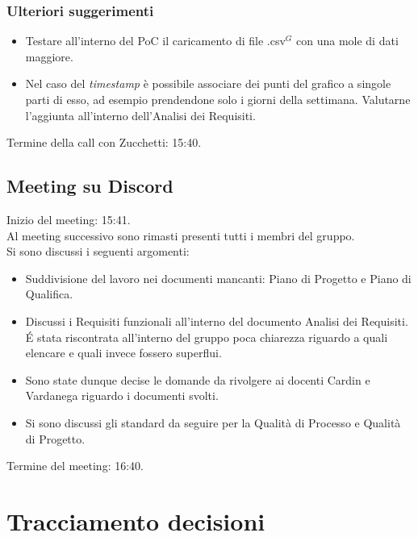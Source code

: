 \subsubsection{Ulteriori suggerimenti}
\begin{itemize}
	\item Testare all'interno del PoC il caricamento di file .csv$^{G}$ con una mole di dati maggiore.
	\item Nel caso del \textit{timestamp} è possibile associare dei punti del grafico a singole parti di esso, ad esempio prendendone solo i giorni della settimana. Valutarne l'aggiunta all'interno dell'Analisi dei Requisiti.
\end{itemize}

\noindent Termine della call con Zucchetti: 15:40.

\subsection{Meeting su Discord}
\noindent 
Inizio del meeting: 15:41. \\
\noindent Al meeting successivo sono rimasti presenti tutti i membri del gruppo. \\
Si sono discussi i seguenti argomenti:
\begin{itemize}
	\item Suddivisione del lavoro nei documenti mancanti: Piano di Progetto e Piano di Qualifica.
	\item Discussi i Requisiti funzionali all'interno del documento Analisi dei Requisiti. \' E stata riscontrata all'interno del gruppo poca chiarezza riguardo a quali elencare e quali invece fossero superflui.
	\item Sono state dunque decise le domande da rivolgere ai docenti Cardin e Vardanega riguardo i documenti svolti.
	\item Si sono discussi gli standard da seguire per la Qualità di Processo e Qualità di Progetto.
\end{itemize}

\noindent Termine del meeting: 16:40.


\section{Tracciamento decisioni}


